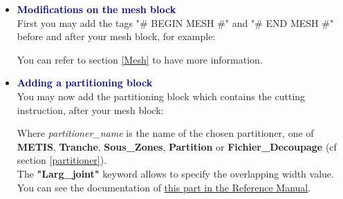 \begin{itemize}
\item \textbf{\textcolor{darkblue}{Modifications on the mesh block}}\\
First you may add the tags "\# BEGIN MESH \#" and "\# END MESH \#" before and after your mesh block, for example:
\begin{center}
\end{center}
You can refer to section \ref{Mesh} to have more information.




\item \textbf{\textcolor{darkblue}{Adding a partitioning block}}\\
You may now add the partitioning block which contains the cutting instruction, after your mesh block:
\begin{center}
\end{center}
Where \textit{partitioner\_name} is the name of the chosen partitioner, one of \textbf{METIS}, \textbf{Tranche}, \textbf{Sous\_Zones}, \textbf{Partition} or \textbf{Fichier\_Decoupage} (cf section \ref{partitioner}).\\
The \textbf{"Larg\_joint"} keyword allows to specify the overlapping width value.
You can see the documentation of \href{\REFERENCEMANUAL\#partition}{this part in the \trustref Reference Manual}.\\


\end{itemize}

